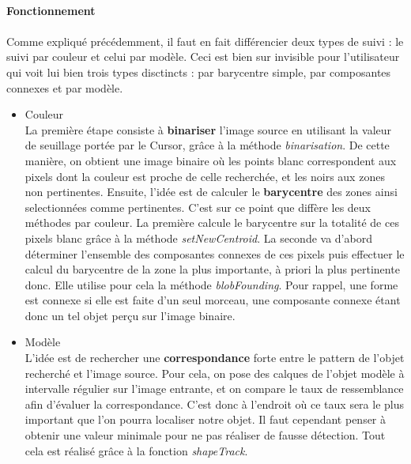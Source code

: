 \documentclass{report}
\begin{document}
						\paragraph{Fonctionnement}\paragraph{}
						Comme expliqué précédemment, il faut en fait différencier deux types de suivi : le suivi par couleur et celui par modèle. Ceci est bien sur invisible pour l'utilisateur qui voit lui bien trois types disctincts : par barycentre simple, par composantes connexes et par modèle.\\
						\begin{itemize}
							\item{\textcolor{vert}{Couleur}}\\
							La première étape consiste à \textbf{binariser} l'image source en utilisant la valeur de seuillage portée par le Cursor, grâce à la méthode \textit{binarisation}. De cette manière, on obtient une image binaire où les points blanc correspondent aux pixels dont la couleur est proche de celle recherchée, et les noirs aux zones non pertinentes. Ensuite, l'idée est de calculer le \textbf{barycentre} des zones ainsi selectionnées comme pertinentes. C'est sur ce point que diffère les deux méthodes par couleur. La première calcule le barycentre sur la totalité de ces pixels blanc grâce à la méthode \textit{setNewCentroid}. La seconde va d'abord déterminer l'ensemble des composantes connexes de ces pixels puis effectuer le calcul du barycentre de la zone la plus importante, à priori la plus pertinente donc. Elle utilise pour cela la méthode \textit{blobFounding}.
Pour rappel, une forme est connexe si elle est faite d'un seul morceau, une composante connexe étant donc un tel objet perçu sur l'image binaire.\\
							\item{\textcolor{marron}{Modèle}}\\
							L'idée est de rechercher une \textbf{correspondance} forte entre le pattern de l'objet recherché et l'image source. Pour cela, on pose des calques de l'objet modèle à intervalle régulier sur l'image entrante, et on compare le taux de ressemblance afin d'évaluer la correspondance. C'est donc à l'endroit où ce taux sera le plus important que l'on pourra localiser notre objet. Il faut cependant penser à obtenir une valeur minimale pour ne pas réaliser de fausse détection. Tout cela est réalisé grâce à la fonction \textit{shapeTrack}.
						\end{itemize}
						\newpage
\end{document}
